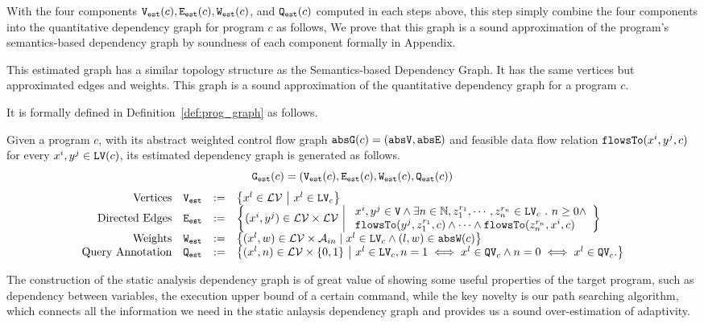With the four components $\mathtt{{V_{est}}}(c), \mathtt{{E_{est}}}(c), \mathtt{{W_{est}}}(c)$, and $\mathtt{{Q_{est}}}(c)$
computed in each steps above, this step simply combine the four components into the quantitative dependency graph for program $c$ as follows,
%
\highlight{
  \[
    \progG(c) = (\progV(c), \progE(c), \progW(c), \progF(c)).
    \]
}
We prove that this graph is a sound approximation of the program's semantics-based dependency graph by soundness of each component formally in Appendix.

This estimated graph has a similar topology structure as 
the Semantics-based Dependency Graph. It has the same
vertices 
but approximated edges and weights.  
This graph is a sound approximation of the quantitative dependency graph for a program $c$.

It is formally defined in Definition~\ref{def:prog_graph} as follows.

\begin{defn}
\label{def:prog_graph}
Given a program $c$, with its abstract weighted control flow graph $\mathtt{abs}{\mathtt{G}}(c) = (\mathtt{abs}{\mathtt{V}}, \mathtt{abs}{\mathtt{E}})$ and 
feasible data flow relation $\mathtt{flowsTo}(x^i, y^j, c)$ for every $x^i, y^j \in \mathtt{LV}(c)$, its estimated dependency graph
is generated as follows.
\[\mathtt{{G_{est}}}(c) = (\mathtt{{V_{est}}}(c), \mathtt{{E_{est}}}(c), \mathtt{{W_{est}}}(c), \mathtt{{Q_{est}}}(c))\]
{\small
\[
\begin{array}{rlcl}
\text{Vertices} &
\progV & := & \left\{ 
x^l \in \mathcal{LV} 
~ \middle\vert ~
x^l \in \lvar_{c}
\right\}
\\
\text{Directed Edges} &
\progE & := & 
\left\{ 
(x^i, y^j) \in \mathcal{LV} \times \mathcal{LV}
~ \middle\vert ~
\begin{array}{l}
x^i, y^j \in \vertxs
\land
\exists n \in \mathbb{N}, z_1^{r_1}, \cdots, z_n^{r_n} \in \lvar_{{c}} \sthat
n \geq 0 \land
\\
\flowsto(y^j,  z_1^{r_1}, c) 
\land \cdots \land \flowsto(z_n^{r_n}, x^i, c) 
\end{array}
\right\}
\\
\text{Weights} &
\progW & := &
\left\{ (x^l, w) \in  \mathcal{LV} \times \mathcal{A}_{in}
\mid
x^l \in \lvar_{{c}} \land (l, w) \in \absW(c)
\right\}
\\
\text{Query Annotation} &
\progF & := & 
\left\{(x^l, n)  \in  \mathcal{LV} \times \{0, 1\} 
~ \middle\vert ~
x^l \in \lvar_{c},
n = 1 \iff x^l \in \qvar_{c} \land n = 0 \iff  x^l \in \qvar_{c} .
\right\}
\end{array}
\] }
\end{defn}
The construction of the static analysis dependency graph is of great value of showing some useful properties of the target program,
such as dependency between variables, the execution upper bound of a certain command,
while the key novelty is our path searching algorithm, which connects all the information we need in the static anlaysis dependency graph and provides us a sound over-estimation of adaptivity.
